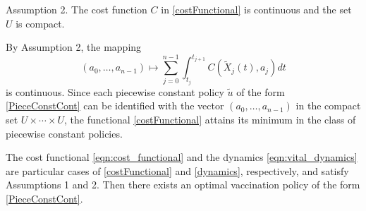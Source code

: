 {\sc Assumption 2}. The cost function $C$ in \eqref{costFunctional} is continuous and the set $U$ is compact. 



By Assumption 2, the mapping
\[
  (a_0,\ldots,a_{n-1})
  \mapsto
  \sum_{j=0}^{n-1}
  \int_{t_j}^{t_{j+1}} C(\tilde{X}_j(t),a_j) dt
\]
is continuous. Since each piecewise constant policy $\tilde{u}$ of the form \eqref{PieceConstCont} can be identified with the vector $(a_0,\ldots,a_{n-1})$ in the compact set $U\times\cdots\times U$, the functional \eqref{costFunctional} attains its minimum in the class of piecewise constant policies.

The cost functional \eqref{eqn:cost_functional} and the dynamics \eqref{eqn:vital_dynamics} are particular cases of \eqref{costFunctional} and \eqref{dynamics}, respectively, and satisfy Assumptions 1 and 2. Then there exists an optimal vaccination policy of the form \eqref{PieceConstCont}.